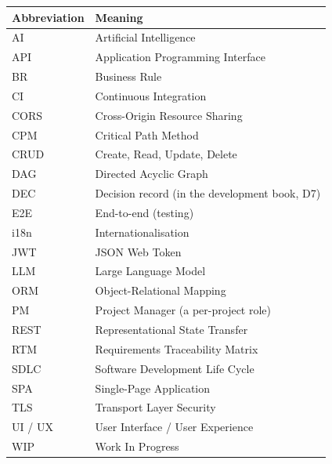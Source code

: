 \documentclass[../main.tex]{subfiles}
\begin{document}
\begin{table}[H]
\centering
\renewcommand{\arraystretch}{1.3}
\begin{tabular}{|p{3.5cm}|p{10cm}|}
\hline
\textbf{Abbreviation} & \textbf{Meaning} \\
\hline
AI & Artificial Intelligence \\ \hline
API & Application Programming Interface \\ \hline
BR & Business Rule \\ \hline
CI & Continuous Integration \\ \hline
CORS & Cross-Origin Resource Sharing \\ \hline
CPM & Critical Path Method \\ \hline
CRUD & Create, Read, Update, Delete \\ \hline
DAG & Directed Acyclic Graph \\ \hline
DEC & Decision record (in the development book, D7) \\ \hline
E2E & End-to-end (testing) \\ \hline
i18n & Internationalisation \\ \hline
JWT & JSON Web Token \\ \hline
LLM & Large Language Model \\ \hline
ORM & Object-Relational Mapping \\ \hline
PM & Project Manager (a per-project role) \\ \hline
REST & Representational State Transfer \\ \hline
RTM & Requirements Traceability Matrix \\ \hline
SDLC & Software Development Life Cycle \\ \hline
SPA & Single-Page Application \\ \hline
TLS & Transport Layer Security \\ \hline
UI / UX & User Interface / User Experience \\ \hline
WIP & Work In Progress \\ \hline
\end{tabular}
\end{table}
\end{document}

